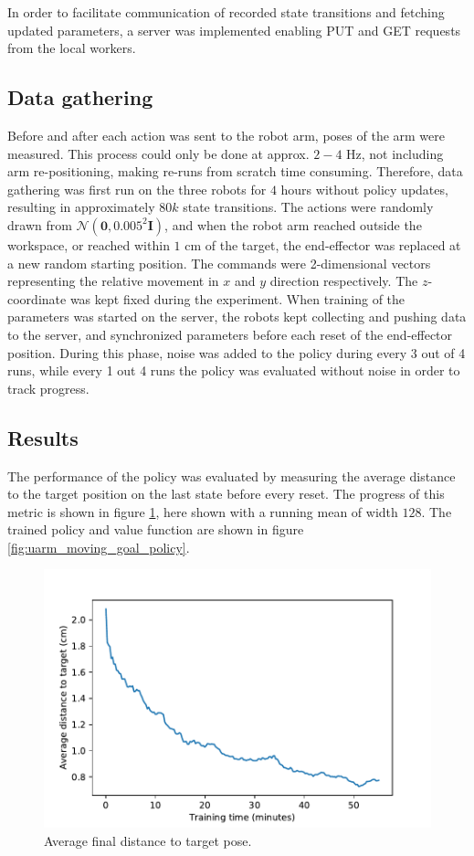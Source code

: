 In order to facilitate communication of recorded state transitions and fetching
updated parameters, a server was implemented enabling PUT and GET requests from
the local workers.

\subsection{Data gathering}

Before and after each action was sent to the robot arm, poses of the arm were
measured. This process could only be done at approx. $2-4$ Hz, not including
arm re-positioning, making re-runs from scratch time consuming. Therefore, data
gathering was first run on the three robots for $4$ hours without policy
updates, resulting in approximately $80k$ state transitions. The actions were
randomly drawn from $\mathcal{N}(\mathbf{0}, 0.005^2 \mathbf{I})$, and when the
robot arm reached outside the workspace, or reached within $1$ cm of the
target, the end-effector was replaced at a new random starting position. The
commands were 2-dimensional vectors representing the relative movement in $x$
and $y$ direction respectively. The $z$-coordinate was kept fixed during the
experiment. When training of the parameters was started on the server, the
robots kept collecting and pushing data to the server, and synchronized
parameters before each reset of the end-effector position. During this phase,
noise was added to the policy during every 3 out of 4 runs, while every 1 out 4
runs the policy was evaluated without noise in order to track progress.

\subsection{Results}

The performance of the policy was evaluated by measuring the average distance
to the target position on the last state before every reset. The progress of
this metric is shown in figure \ref{fig:uarm_moving_goal_progress}, here shown
with a running mean of width $128$. The trained policy and value function are
shown in figure \ref{fig:uarm_moving_goal_policy}.

\begin{figure}[h!]
    \centering
    \includegraphics[width=0.50 \textwidth]{res/uarm_moving_goal_progress.pdf}

    \caption{Average final distance to target pose.}
    \label{fig:uarm_moving_goal_progress}
    
\end{figure}

